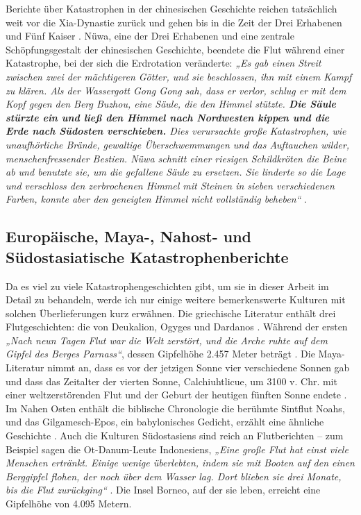 \documentclass[10pt,twocolumn,letterpaper]{article}
\begin{document}
Berichte über Katastrophen in der chinesischen Geschichte reichen tatsächlich weit vor die Xia-Dynastie zurück und gehen bis in die Zeit der Drei Erhabenen und Fünf Kaiser \cite{7}. Nüwa, eine der Drei Erhabenen und eine zentrale Schöpfungsgestalt der chinesischen Geschichte, beendete die Flut während einer Katastrophe, bei der sich die Erdrotation veränderte: \textit{„Es gab einen Streit zwischen zwei der mächtigeren Götter, und sie beschlossen, ihn mit einem Kampf zu klären. Als der Wassergott Gong Gong sah, dass er verlor, schlug er mit dem Kopf gegen den Berg Buzhou, eine Säule, die den Himmel stützte. \textbf{Die Säule stürzte ein und ließ den Himmel nach Nordwesten kippen und die Erde nach Südosten verschieben.} Dies verursachte große Katastrophen, wie unaufhörliche Brände, gewaltige Überschwemmungen und das Auftauchen wilder, menschenfressender Bestien. Nüwa schnitt einer riesigen Schildkröten die Beine ab und benutzte sie, um die gefallene Säule zu ersetzen. Sie linderte so die Lage und verschloss den zerbrochenen Himmel mit Steinen in sieben verschiedenen Farben, konnte aber den geneigten Himmel nicht vollständig beheben“} \cite{8}.

\subsection{Europäische, Maya-, Nahost- und Südostasiatische Katastrophenberichte}

Da es viel zu viele Katastrophengeschichten gibt, um sie in dieser Arbeit im Detail zu behandeln, werde ich nur einige weitere bemerkenswerte Kulturen mit solchen Überlieferungen kurz erwähnen. Die griechische Literatur enthält drei Flutgeschichten: die von Deukalion, Ogyges und Dardanos \cite{9,10}. Während der ersten \textit{„Nach neun Tagen Flut war die Welt zerstört, und die Arche ruhte auf dem Gipfel des Berges Parnass“}, dessen Gipfelhöhe 2.457 Meter beträgt \cite{11}. Die Maya-Literatur nimmt an, dass es vor der jetzigen Sonne vier verschiedene Sonnen gab und dass das Zeitalter der vierten Sonne, Calchiuhtlicue, um 3100 v. Chr. mit einer weltzerstörenden Flut und der Geburt der heutigen fünften Sonne endete \cite{12}. Im Nahen Osten enthält die biblische Chronologie die berühmte Sintflut Noahs, und das Gilgamesch-Epos, ein babylonisches Gedicht, erzählt eine ähnliche Geschichte \cite{13}. Auch die Kulturen Südostasiens sind reich an Flutberichten – zum Beispiel sagen die Ot-Danum-Leute Indonesiens, \textit{„Eine große Flut hat einst viele Menschen ertränkt. Einige wenige überlebten, indem sie mit Booten auf den einen Berggipfel flohen, der noch über dem Wasser lag. Dort blieben sie drei Monate, bis die Flut zurückging“} \cite{3}. Die Insel Borneo, auf der sie leben, erreicht eine Gipfelhöhe von 4.095 Metern.
\end{document}
